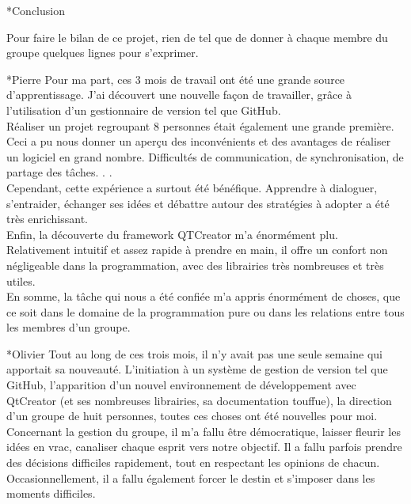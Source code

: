 \documentclass[a4paper, 12pt]{report}
\begin{document}
	\begin{chapter}*{Conclusion}
		Pour faire le bilan de ce projet, rien de tel que de donner à chaque membre du groupe quelques lignes pour s'exprimer.

		\begin{section}*{Pierre}
		Pour ma part, ces 3 mois de travail ont été une grande source d'apprentissage. J'ai découvert une nouvelle façon de travailler,
		grâce à l'utilisation d'un gestionnaire de version tel que GitHub.\\
		Réaliser un projet regroupant 8 personnes était également une grande première.
		Ceci a pu nous donner un aperçu des inconvénients et des avantages de réaliser un logiciel en grand nombre. Difficultés de communication,
		de synchronisation, de partage des tâches. . .\\
		Cependant, cette expérience a surtout été bénéfique. Apprendre à dialoguer, s'entraider, échanger ses
		idées et débattre autour des stratégies à adopter a été très enrichissant.\\
		Enfin, la découverte du framework QTCreator m'a énormément plu.
		Relativement intuitif et assez rapide à prendre en main, il offre un confort non négligeable dans la programmation,
	    avec des librairies très nombreuses et très utiles.\\
	    En somme, la tâche qui nous a été confiée m'a appris énormément de choses, que ce soit dans le domaine de la programmation pure ou dans les 
	    relations entre tous les membres d'un groupe.
		\end{section}

		\begin{section}*{Olivier}
		Tout au long de ces trois mois, il n'y avait pas une seule semaine qui apportait sa nouveauté. 
		L'initiation à un système de gestion de version tel que GitHub, l’apparition d'un nouvel environnement de développement avec QtCreator 
		(et ses nombreuses librairies, sa documentation touffue), la direction d'un groupe de huit personnes, toutes ces choses ont été nouvelles
		pour moi.\\

		Concernant la gestion du groupe, il m'a fallu être démocratique, laisser fleurir les idées en vrac, canaliser chaque esprit vers notre 
		objectif. Il a fallu parfois prendre des décisions difficiles rapidement, tout en respectant les opinions de chacun. Occasionnellement, il a
		fallu également forcer le destin et s'imposer dans les moments difficiles.\\


\end{section}
\end{chapter}
\end{document}

